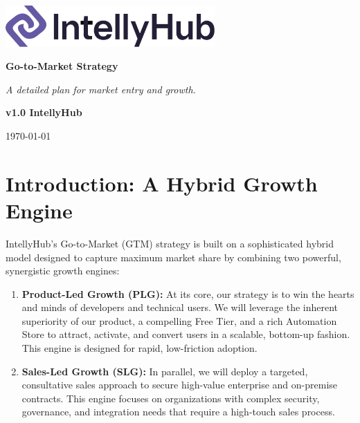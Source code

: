 \documentclass[11pt, a4paper, oneside]{article}
\begin{document}
\thispagestyle{empty} 
\begin{titlepage}
    \centering
    \vspace{1cm}
    
    \includegraphics[width=0.6\textwidth]{IntellyHub_Logo_Colored.png}
    
    \vspace{2.5cm}
    
    {\Huge\bfseries\color{PrimaryColor}Go-to-Market Strategy}
    
    \vspace{1.5cm}
    
    {\Large\itshape\lightfont A detailed plan for market entry and growth.}
    
    \vfill %
    
    {\large\bfseries\color{PrimaryColor}v1.0 \color{SecondaryColor}IntellyHub}
    
    \vspace{0.5cm}
    
    {\large \today}
    
\end{titlepage}

\tableofcontents
\newpage

\section{Introduction: A Hybrid Growth Engine}
IntellyHub's Go-to-Market (GTM) strategy is built on a sophisticated hybrid model designed to capture maximum market share by combining two powerful, synergistic growth engines:

\begin{enumerate}
    \item \textbf{Product-Led Growth (PLG):} At its core, our strategy is to win the hearts and minds of developers and technical users. We will leverage the inherent superiority of our product, a compelling Free Tier, and a rich Automation Store to attract, activate, and convert users in a scalable, bottom-up fashion. This engine is designed for rapid, low-friction adoption.
    
    \item \textbf{Sales-Led Growth (SLG):} In parallel, we will deploy a targeted, consultative sales approach to secure high-value enterprise and on-premise contracts. This engine focuses on organizations with complex security, governance, and integration needs that require a high-touch sales process.
\end{enumerate}
\end{document}
